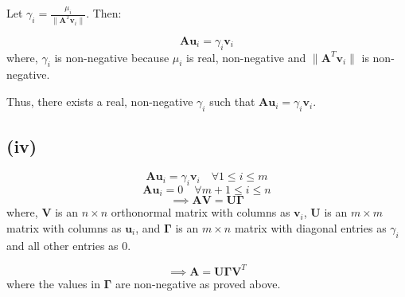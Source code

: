 \documentclass{article}
\begin{document}
Let \( \gamma_i = \frac{\mu_i}{\|\mathbf{A}^T\mathbf{v}_i\|} \). Then:

$$\mathbf{A} \mathbf{u}_i = \gamma_i \mathbf{v}_i$$
where, \( \gamma_i \) is non-negative because \( \mu_i \) is real, non-negative and \( \|\mathbf{A}^T\mathbf{v}_i\| \) is non-negative.

Thus, there exists a real, non-negative \( \gamma_i \) such that \( \mathbf{A} \mathbf{u}_i = \gamma_i \mathbf{v}_i \).

\subsection*{(iv)}

$$\mathbf{A}\mathbf{u}_i = \gamma_i \mathbf{v}_i \quad \forall 1 \leq i \leq m$$
$$\mathbf{A}\mathbf{u}_i = 0 \quad \forall m+1 \leq i \leq n$$
$$\implies \mathbf{A} \mathbf{V} = \mathbf{U} \mathbf{\Gamma}$$
where, \( \mathbf{V} \) is an \( n \times n \) orthonormal matrix with columns as \( \mathbf{v}_i \), \( \mathbf{U} \) is an \( m \times m \) matrix with columns as \( \mathbf{u}_i \), and \( \mathbf{\Gamma} \) is an \( m \times n \) matrix with diagonal entries as \( \gamma_i \) and all other entries as 0.

$$\implies \mathbf{A} = \mathbf{U} \mathbf{\Gamma} \mathbf{V}^T$$
where the values in \( \mathbf{\Gamma} \) are non-negative as proved above.
\end{document}
